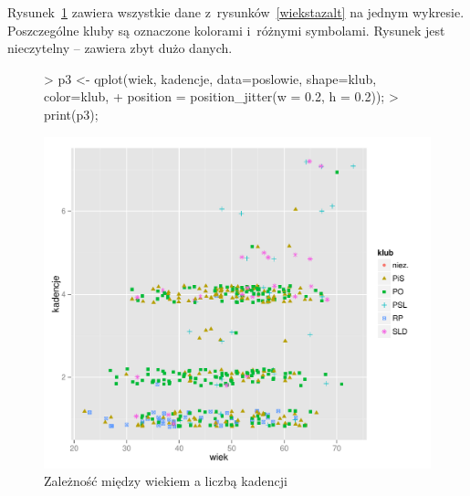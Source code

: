 \documentclass[a4paper]{article}
\begin{document}
Rysunek~\ref{wiekstaz} zawiera 
wszystkie dane z~rysunków~\ref{wiekstazalt} na jednym wykresie. Poszczególne
kluby są oznaczone kolorami i~różnymi symbolami. Rysunek jest nieczytelny -- zawiera zbyt dużo danych.

\begin{figure}[!tbh]
\begin{Schunk}
\begin{Sinput}
> p3 <- qplot(wiek, kadencje, data=poslowie, shape=klub, color=klub, 
+             position = position_jitter(w = 0.2, h = 0.2));
> print(p3);
\end{Sinput}
\end{Schunk}
\includegraphics{sejm7_wg_stazu_wieku-wiekstaz}
\caption{Zależność między wiekiem a liczbą kadencji\label{wiekstaz}}
\end{figure}
\end{document}

